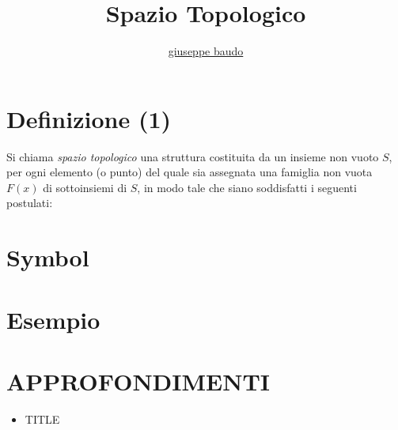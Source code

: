 \documentclass[a4paper,10pt]{article}
\title{Spazio Topologico}
\author{\href{http://www.baudo.hol.es}{giuseppe baudo}}
\begin{document}
\maketitle

\section{Definizione (1)}
Si chiama \textit{spazio topologico} una struttura costituita da un insieme non vuoto $S$, per ogni elemento (o punto) del quale sia assegnata una famiglia non vuota
$F(x)$ di sottoinsiemi di $S$, in modo tale che siano soddisfatti i seguenti postulati:

\section{Symbol}

\section{Esempio}

\section{APPROFONDIMENTI}
\begin{itemize}
 \item TITLE
\end{itemize}
\end{document}
